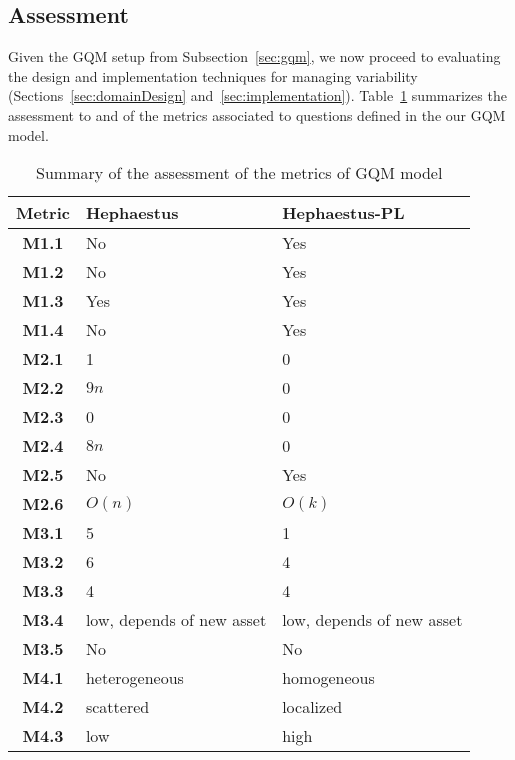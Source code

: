 \subsection{Assessment} \label{sec:assessment}

Given the GQM setup from Subsection~\ref{sec:gqm}, we now proceed to evaluating the design and implementation techniques for managing variability (Sections~\ref{sec:domainDesign} and~\ref{sec:implementation}). Table~\ref{tab:assessment-hpl-hp} summarizes the assessment to \hp{} and \hpl{} of the metrics associated to questions defined in the our GQM model.


\begin{table}[h]
\begin{center}
\begin{tabular}{||c|| p{5cm} || p{5cm}||}
  \hline
  \textbf{Metric} & \textbf{Hephaestus} & \textbf{Hephaestus-PL}   \\  \hline  \hline 
  \textbf{M1.1} & No  & Yes \\  \hline
  \textbf{M1.2} & No  & Yes \\  \hline
  \textbf{M1.3} & Yes & Yes \\  \hline
  \textbf{M1.4} & No  & Yes \\  \hline \hline   
  \textbf{M2.1} & 1  & 0 \\  \hline
  \textbf{M2.2} & $9n$  & 0 \\  \hline
  \textbf{M2.3} & 0  & 0 \\  \hline
  \textbf{M2.4} & $8n$  & 0 \\  \hline  
  \textbf{M2.5} & No & Yes \\  \hline  
  \textbf{M2.6} & $O(n)$ & $O(k)$ \\  \hline  \hline 
  \textbf{M3.1} & 5  & 1 \\  \hline
  \textbf{M3.2} & 6  & 4 \\  \hline
  \textbf{M3.3} & 4 & 4 \\  \hline
  \textbf{M3.4} & low, depends of new asset &  low, depends of new asset \\  \hline  
  \textbf{M3.5} & No & No \\  \hline \hline 
  \textbf{M4.1} & heterogeneous  & homogeneous \\  \hline
  \textbf{M4.2} & scattered      & localized \\  \hline
  \textbf{M4.3} & low            & high \\  \hline
\end{tabular}
\caption{Summary of the assessment of the metrics of GQM model}
\label{tab:assessment-hpl-hp}
\end{center}
\end{table}


